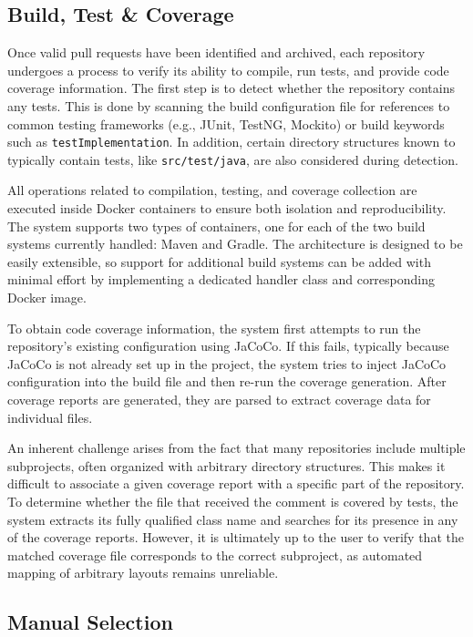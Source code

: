 \subsection{Build, Test \& Coverage}

Once valid pull requests have been identified and archived, each repository undergoes a process to
verify its ability to compile, run tests, and provide code coverage information. The first step is
to detect whether the repository contains any tests. This is done by scanning the build
configuration file for references to common testing frameworks (e.g., JUnit, TestNG, Mockito) or
build keywords such as \texttt{testImplementation}. In addition, certain directory structures known
to typically contain tests, like \texttt{src/test/java}, are also considered during detection.

All operations related to compilation, testing, and coverage collection are executed inside Docker
containers to ensure both isolation and reproducibility. The system supports two types of
containers, one for each of the two build systems currently handled: Maven and Gradle. The
architecture is designed to be easily extensible, so support for additional build systems can be
added with minimal effort by implementing a dedicated handler class and corresponding Docker image.

To obtain code coverage information, the system first attempts to run the repository’s existing
configuration using JaCoCo. If this fails, typically because JaCoCo is not already set up in the
project, the system tries to inject JaCoCo configuration into the build file and then re-run the
coverage generation. After coverage reports are generated, they are parsed to extract coverage data
for individual files.

An inherent challenge arises from the fact that many repositories include multiple subprojects,
often organized with arbitrary directory structures. This makes it difficult to associate a given
coverage report with a specific part of the repository. To determine whether the file that received
the comment is covered by tests, the system extracts its fully qualified class name and searches for
its presence in any of the coverage reports. However, it is ultimately up to the user to verify that
the matched coverage file corresponds to the correct subproject, as automated mapping of arbitrary
layouts remains unreliable.

\subsection{Manual Selection}
\label{sec:manual-selection}


